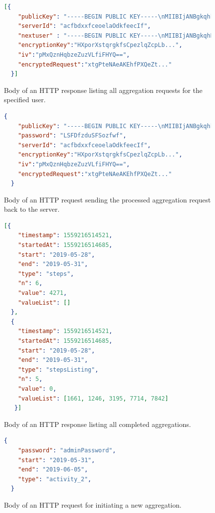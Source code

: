 \begin{figure}[h!]
  \begin{lstlisting}[language=json,firstnumber=1]
  [{
    "publicKey": "-----BEGIN PUBLIC KEY-----\nMIIBIjANBgkqhkiG...",
    "serverId": "acfbdxxfceoelaOdkfeecIf",
    "nextuser" : "-----BEGIN PUBLIC KEY-----\nMIIBIjANBgkqhBms...",
    "encryptionKey":"HXporXstqrgkfsCpezlqZcpLb...",
    "iv":"pMxQznHqbzeZuzVLfiFHYQ==",
    "encryptedRequest":"xtgPteNAeAKEhfPXQeZt..."
  }]
  \end{lstlisting}
  \caption{Body of an HTTP response listing all aggregation requests for the specified user.}
  \label{get-requests-response}
\end{figure}

\begin{figure}[h!]
  \begin{lstlisting}[language=json,firstnumber=1]
  {
    "publicKey": "-----BEGIN PUBLIC KEY-----\nMIIBIjANBgkqhkiG...",
    "password": "LSFDfzduSFSozfwf",
    "serverId": "acfbdxxfceoelaOdkfeecIf",
    "encryptionKey":"HXporXstqrgkfsCpezlqZcpLb...",
    "iv":"pMxQznHqbzeZuzVLfiFHYQ==",
    "encryptedRequest":"xtgPteNAeAKEhfPXQeZt..."
  }
  \end{lstlisting}
  \caption{Body of an HTTP request sending the processed aggregation request back to the server.}
  \label{post-request}
\end{figure}

\begin{figure}[h!]
  \begin{lstlisting}[language=json,firstnumber=1]
  [{
    "timestamp": 1559216514521,
    "startedAt": 1559216514685,
    "start": "2019-05-28",
    "end": "2019-05-31",
    "type": "steps",
    "n": 6,
    "value": 4271,
    "valueList": []
  },
  {
    "timestamp": 1559216514521,
    "startedAt": 1559216514685,
    "start": "2019-05-28",
    "end": "2019-05-31",
    "type": "stepsListing",
    "n": 5,
    "value": 0,
    "valueList": [1661, 1246, 3195, 7714, 7842]
   }]
  \end{lstlisting}
  \caption{Body of an HTTP response listing all completed aggregations.}
  \label{get-aggregations}
\end{figure}

\begin{figure}[h!]
  \begin{lstlisting}[language=json,firstnumber=1]
  {
    "password": "adminPassword",
    "start": "2019-05-31",
    "end": "2019-06-05",
    "type": "activity_2",
  }
  \end{lstlisting}
  \caption{Body of an HTTP request for initiating a new aggregation.}
  \label{insert-sample}
\end{figure}

